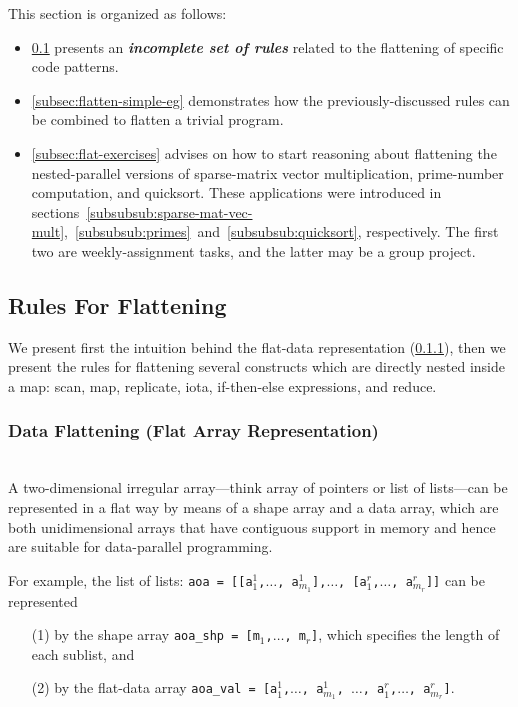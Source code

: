 \documentclass[acmsmall,review]{acmart}\settopmatter{printfolios=true,printccs=false,printacmref=false}
\begin{document}
This section is organized as follows:
\begin{itemize}
    \item \cref{subsec:flatten-rules} presents an \textbf{\em incomplete set of 
        rules} related to the flattening of specific code patterns.
    \item \cref{subsec:flatten-simple-eg} demonstrates how the 
        previously-discussed rules can be combined to flatten a 
        trivial program.
    \item \cref{subsec:flat-exercises} advises on how to start
        reasoning about flattening the nested-parallel versions
        of sparse-matrix vector multiplication, prime-number computation,
        and quicksort. These applications were introduced in
        sections~\ref{subsubsub:sparse-mat-vec-mult},~\ref{subsubsub:primes}~and~\ref{subsubsub:quicksort},
        respectively. The first two are weekly-assignment tasks,
        and the latter may be a group project.
\end{itemize}

\subsection{Rules For Flattening}
\label{subsec:flatten-rules}

We present first the intuition behind the flat-data representation
(\cref{subsubsec:data-flat}), then we present the rules for flattening
several constructs which are directly nested inside a map:
scan, map, replicate, iota, if-then-else expressions, and reduce. 

\subsubsection{Data Flattening (Flat Array Representation)}
\label{subsubsec:data-flat}
$\mbox{ }$\\

A two-dimensional irregular array---think array of pointers or 
list of lists---can be represented in a flat way by means of
a shape array and a data array, which are both unidimensional
arrays that have contiguous support in memory and hence are
suitable for data-parallel programming. 

For example, the list of lists:
{\tt aoa = [[a$^{1}_{1}$,$\ldots$, a$^{1}_{m{_1}}$],$\ldots$, [a$^{r}_{1}$,$\ldots$, a$^{r}_{m{_r}}$]]}
can be represented 
\begin{itemize}
    \item[(1)] by the shape array {\tt aoa\_shp = [m$_1$,$\ldots$, m$_r$]}, which specifies the length
            of each sublist, and
    \item[(2)] by the flat-data array
    {\tt aoa\_val = [a$^{1}_{1}$,$\ldots$, a$^{1}_{m{_1}}$, $\ldots$, a$^{r}_{1}$,$\ldots$, a$^{r}_{m{_r}}$]}.
\end{itemize}
\end{document}
